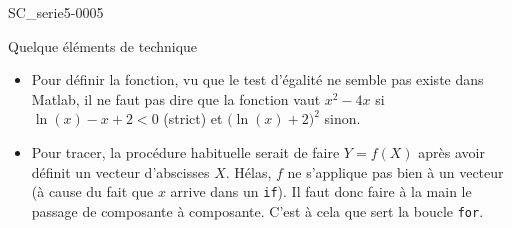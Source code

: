 \begin{corrige}{SC_serie5-0005}

	Quelque éléments de technique
	\begin{itemize}
		\item 
			Pour définir la fonction, vu que le test d'égalité ne semble pas existe dans Matlab, il ne faut pas dire que la fonction vaut $x^2-4x$ si $\ln(x)-x+2<0$ (strict) et $\big( \ln(x)+2 \big)^2$ sinon.
		\item
			Pour tracer, la procédure habituelle serait de faire $Y=f(X)$ après avoir définit un vecteur d'abscisses $X$. Hélas, $f$ ne s'applique pas bien à un vecteur (à cause du fait que $x$ arrive dans un \verb+if+). Il faut donc faire à la main le passage de composante à composante. C'est à cela que sert la boucle \verb+for+.
	\end{itemize}
	


\end{corrige}
